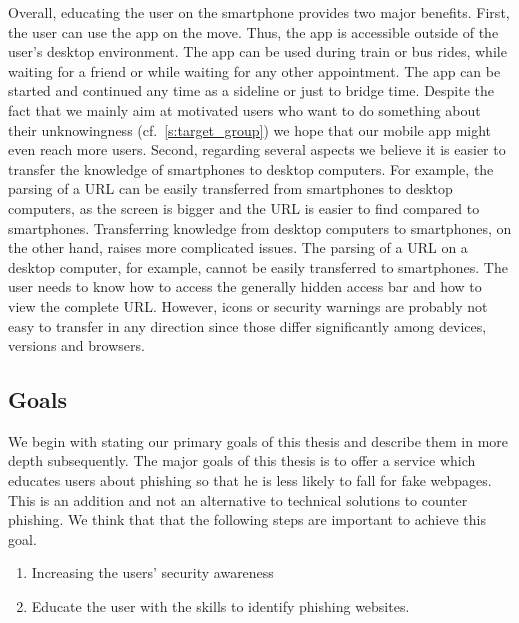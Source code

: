 Overall, educating the user on the smartphone provides two major benefits.
 First, the user can use the app on the move.
 Thus, the app is accessible outside of the user's desktop environment.
 The app can be used during train or bus rides, while waiting for a friend or while waiting for any other appointment.
 The app can be started and continued any time as a sideline or just to bridge time.
Despite the fact that we mainly aim at motivated users who want to do something about their unknowingness (cf.~\autoref{s:target_group}) we hope that our mobile app might even reach more users.
 Second, regarding several aspects we believe it is easier to transfer the knowledge of smartphones to desktop computers.
For example, the parsing of a URL can be easily transferred from smartphones to desktop computers, as the screen is bigger and the URL is easier to find compared to smartphones.
 Transferring knowledge from desktop computers to smartphones, on the other hand, raises more complicated issues.
The parsing of a URL on a desktop computer, for example, cannot be easily transferred to smartphones.
The user needs to know how to access the generally hidden access bar and how to view the complete URL.
However, icons or security warnings are probably not easy to transfer in any direction since those differ significantly among devices, versions and browsers.

 
\subsection{Goals}
\label{s:goals}
We begin with stating our primary goals of this thesis and describe them in more depth subsequently.
The major goals of this thesis is to offer a service which educates users about phishing so that he is less likely to fall for fake webpages.
 This is an addition and not an alternative to technical solutions to counter phishing.
 We think that that the following steps are important to achieve this goal.


\begin{enumerate}
	\item Increasing the users' security awareness
	\item Educate the user with the skills to identify phishing websites.

\end{enumerate}

